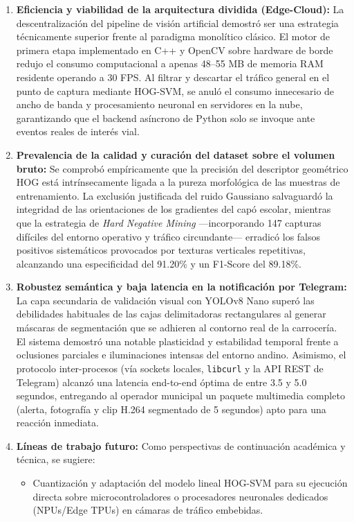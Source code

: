 \documentclass[12pt]{article}
\begin{document}
\begin{enumerate}
    \item \textbf{Eficiencia y viabilidad de la arquitectura dividida (Edge-Cloud):} La descentralización del pipeline de visión artificial demostró ser una estrategia técnicamente superior frente al paradigma monolítico clásico. El motor de primera etapa implementado en C++ y OpenCV sobre hardware de borde redujo el consumo computacional a apenas 48--55 MB de memoria RAM residente operando a 30 FPS. Al filtrar y descartar el tráfico general en el punto de captura mediante HOG-SVM, se anuló el consumo innecesario de ancho de banda y procesamiento neuronal en servidores en la nube, garantizando que el backend asíncrono de Python solo se invoque ante eventos reales de interés vial.
    \item \textbf{Prevalencia de la calidad y curación del dataset sobre el volumen bruto:} Se comprobó empíricamente que la precisión del descriptor geométrico HOG está intrínsecamente ligada a la pureza morfológica de las muestras de entrenamiento. La exclusión justificada del ruido Gaussiano salvaguardó la integridad de las orientaciones de los gradientes del capó escolar, mientras que la estrategia de \emph{Hard Negative Mining} —incorporando 147 capturas difíciles del entorno operativo y tráfico circundante— erradicó los falsos positivos sistemáticos provocados por texturas verticales repetitivas, alcanzando una especificidad del 91.20\% y un F1-Score del 89.18\%.
    \item \textbf{Robustez semántica y baja latencia en la notificación por Telegram:} La capa secundaria de validación visual con YOLOv8 Nano superó las debilidades habituales de las cajas delimitadoras rectangulares al generar máscaras de segmentación que se adhieren al contorno real de la carrocería. El sistema demostró una notable plasticidad y estabilidad temporal frente a oclusiones parciales e iluminaciones intensas del entorno andino. Asimismo, el protocolo inter-procesos (vía sockets locales, \texttt{libcurl} y la API REST de Telegram) alcanzó una latencia end-to-end óptima de entre 3.5 y 5.0 segundos, entregando al operador municipal un paquete multimedia completo (alerta, fotografía y clip H.264 segmentado de 5 segundos) apto para una reacción inmediata.
    \item \textbf{Líneas de trabajo futuro:} Como perspectivas de continuación académica y técnica, se sugiere:
    \begin{itemize}
        \item Cuantización y adaptación del modelo lineal HOG-SVM para su ejecución directa sobre microcontroladores o procesadores neuronales dedicados (NPUs/Edge TPUs) en cámaras de tráfico embebidas.

\end{itemize}
\end{enumerate}
\end{document}
